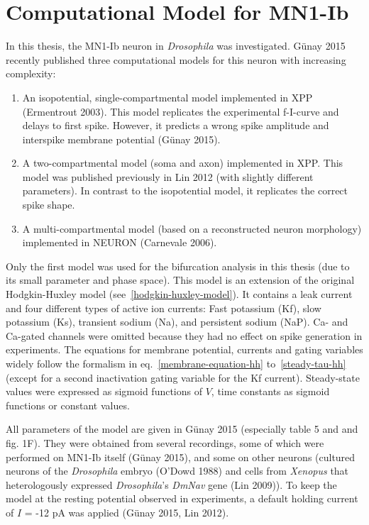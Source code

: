 \documentclass[12pt,a4paper,]{report}
\begin{document}
\section{Computational Model for MN1-Ib}\label{mn1-ib-model}

In this thesis, the MN1-Ib neuron in \emph{Drosophila} was investigated.
Günay 2015 recently published three computational models for this neuron
with increasing complexity:

\begin{enumerate}
\def\labelenumi{\arabic{enumi}.}
\item
  An isopotential, single-compartmental model implemented in XPP
  (Ermentrout 2003). This model replicates the experimental f-I-curve
  and delays to first spike. However, it predicts a wrong spike
  amplitude and interspike membrane potential (Günay 2015).
\item
  A two-compartmental model (soma and axon) implemented in XPP. This
  model was published previously in Lin 2012 (with slightly different
  parameters). In contrast to the isopotential model, it replicates the
  correct spike shape.
\item
  A multi-compartmental model (based on a reconstructed neuron
  morphology) implemented in NEURON (Carnevale 2006).
\end{enumerate}

Only the first model was used for the bifurcation analysis in this
thesis (due to its small parameter and phase space). This model is an
extension of the original Hodgkin-Huxley model
(see~\ref{hodgkin-huxley-model}). It contains a leak current and four
different types of active ion currents: Fast potassium (Kf), slow
potassium (Ks), transient sodium (Na), and persistent sodium (NaP). Ca-
and Ca-gated channels were omitted because they had no effect on spike
generation in experiments. The equations for membrane potential,
currents and gating variables widely follow the formalism in
eq.~\ref{membrane-equation-hh} to~\ref{steady-tau-hh} (except for a
second inactivation gating variable for the Kf current). Steady-state
values were expressed as sigmoid functions of $V$, time constants as
sigmoid functions or constant values.

All parameters of the model are given in Günay 2015 (especially table 5
and and fig. 1F). They were obtained from several recordings, some of
which were performed on MN1-Ib itself (Günay 2015), and some on other
neurons (cultured neurons of the \emph{Drosophila} embryo (O'Dowd 1988)
and cells from \emph{Xenopus} that heterologously expressed
\emph{Drosophila}'s \emph{DmNav} gene (Lin 2009)). To keep the model at
the resting potential observed in experiments, a default holding current
of $I$ = -12 pA was applied (Günay 2015, Lin 2012).
\end{document}
